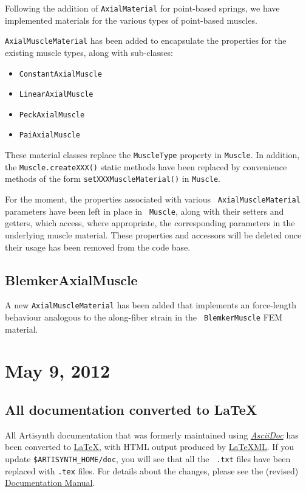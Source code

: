 \documentclass{article}
\begin{document}
Following the addition of {\tt AxialMaterial} for point-based springs,
we have implemented materials for the various types of point-based muscles.

{\tt AxialMuscleMaterial} has been added to encapsulate the properties 
for the existing muscle types, along with sub-classes:
\begin{itemize}
\item {\tt ConstantAxialMuscle}
\item {\tt LinearAxialMuscle}
\item {\tt PeckAxialMuscle}
\item {\tt PaiAxialMuscle}
\end{itemize}

These material classes replace the {\tt MuscleType} property in {\tt Muscle}. 
In addition, the {\tt Muscle.createXXX()} static methods have been 
replaced by convenience methods of the form {\tt setXXXMuscleMaterial()} in {\tt Muscle}.

For the moment, the properties associated with various {\tt
AxialMuscleMaterial} parameters have been left in place in {\tt
Muscle}, along with their setters and getters, which access, where
appropriate, the corresponding parameters in the underlying muscle
material. These properties and accessors will be deleted once their
usage has been removed from the code base.

\subsection*{BlemkerAxialMuscle}

A new {\tt AxialMuscleMaterial} has been added that implements an
force-length behaviour analogous to the along-fiber strain in the {\tt
BlemkerMuscle} FEM material.

\section*{May 9, 2012}

\subsection*{All documentation converted to LaTeX}

All Artisynth documentation that was formerly maintained using
\href{http://www.methods.co.nz/asciidoc}{\it AsciiDoc} has been
converted to \href{http://www.latex-project.org}{LaTeX}, with HTML
output produced by \href{http://dlmf.nist.gov/LaTeXML}{LaTeXML}.  If
you update {\tt \$ARTISYNTH\_HOME/doc}, you will see that all the {\tt
.txt} files have been replaced with {\tt .tex} files. For details
about the changes, please see the (revised)
\href{http://www.artisynth.org/doc/html/documentation/documentation.html}%
{Documentation Manual}.
\end{document}
